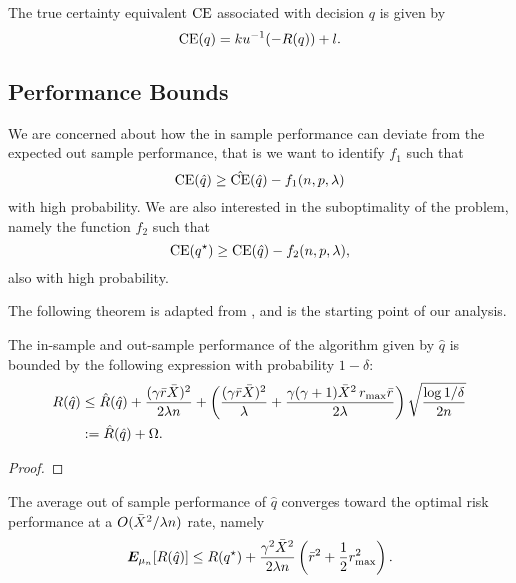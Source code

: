 \documentclass[11pt]{article}
\begin{document}

\begin{deff}
  The true certainty equivalent $\operatorname{CE}$ associated with decision $q$ is given by
  \[
    \operatorname{CE}(q) = ku^{-1}(-R(q)) + l.
  \]
\end{deff}

\subsection{Performance Bounds}

We are concerned about how the in sample performance can deviate from the expected out sample
performance, that is we want to identify $f_1$ such that
\[
  \operatorname{CE}(\hat q) \geq \hat{\operatorname{CE}}(\hat q) - f_1(n,p,\lambda)
\]
with high probability. We are also interested in the suboptimality of the problem, namely
the function $f_2$ such that
\[
  \operatorname{CE}(q^\star) \geq \operatorname{CE}(\hat q) - f_2(n,p,\lambda),
\]
also with high probability. 

The following theorem is adapted from \cite{bousquet2002stability}, and is the starting point of our
analysis. 

\begin{thm}
  \label{thm1}
  The in-sample and out-sample performance of the algorithm given by $\hat q$ is bounded
  by the following expression with probability $1-\delta$:
  \begin{align*}
    R(\hat q) &\leq \hat R(\hat q) + \frac{(\gamma\bar r\bar X)^2}{2\lambda n} +
    \left(\frac{(\gamma\bar r\bar X)^2}{\lambda} + \frac{\gamma(\gamma+1)\bar X^2\,r_{\max}\bar
    r}{2\lambda}\right)\sqrt{\frac{\log 1/\delta}{2n}}\\
              &:= \hat R(\hat q) + \Omega.
  \end{align*}
\end{thm}

\begin{proof}
\end{proof}

\begin{thm}
  \label{newthm}
  The average out of sample performance of $\hat q$ converges toward the optimal risk
  performance at a $O(\bar X^2/\lambda n)$ rate, namely
  \[
    \bm E_{\mu_n}[R(\hat q)] \leq R(q^\star) +\frac{\gamma^2\bar X^2}{2\lambda n}\left(\bar
      r^2 + \frac{1}{2}r_{\max}^2\right).
  \]
\end{thm}
\end{document}
